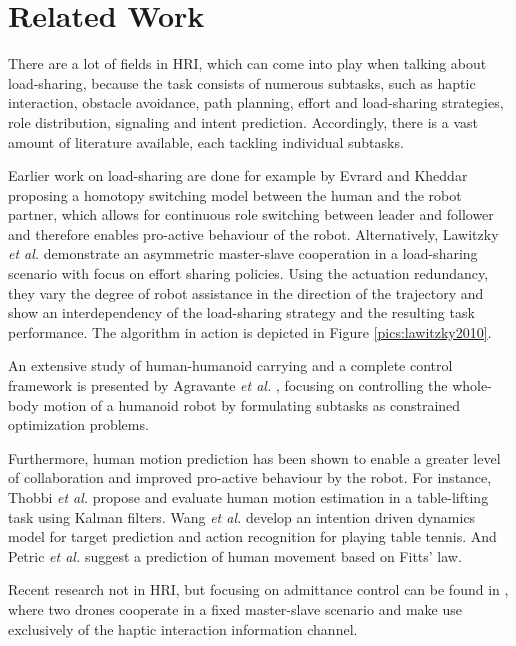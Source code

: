 \chapter{Related Work}
There are a lot of fields in HRI, which can come into play when talking about load-sharing, because the task consists of numerous subtasks, such as haptic interaction, obstacle avoidance, path planning, effort and load-sharing strategies, role distribution, signaling and intent prediction. Accordingly, there is a vast amount of literature available, each tackling individual subtasks.

Earlier work on load-sharing are done for example by Evrard and Kheddar \citep{evrard2009homotopy} proposing a homotopy switching model between the human and the robot partner, which allows for continuous role switching between leader and follower and therefore enables pro-active behaviour of the robot. Alternatively, Lawitzky \textit{et al.} \citep{lawitzky2010load} demonstrate an asymmetric master-slave cooperation in a load-sharing scenario with focus on effort sharing policies. Using the actuation redundancy, they vary the degree of robot assistance in the direction of the trajectory and show an interdependency of the load-sharing strategy and the resulting task performance. The algorithm in action is depicted in Figure \ref{pics:lawitzky2010}.

An extensive study of human-humanoid carrying and a complete control framework is presented by Agravante \textit{et al.} \citep{agravante2016human}, focusing on controlling the whole-body motion of a humanoid robot by formulating subtasks as constrained optimization problems.

Furthermore, human motion prediction has been shown to enable a greater level of collaboration and improved pro-active behaviour by the robot. For instance, Thobbi \textit{et al.} \citep{thobbi2011using} propose and evaluate human motion estimation in a table-lifting task using Kalman filters. Wang \textit{et al.} \citep{wang2013probabilistic} develop an intention driven dynamics model for target prediction and action recognition for playing table tennis. And Petric \textit{et al.} \citep{petrivc2016cooperative} suggest a prediction of human movement based on Fitts' law.

Recent research not in HRI, but focusing on admittance control can be found in \citep{tagliabue2017collaborative}, where two drones cooperate in a fixed master-slave scenario and make use exclusively of the haptic interaction information channel.


